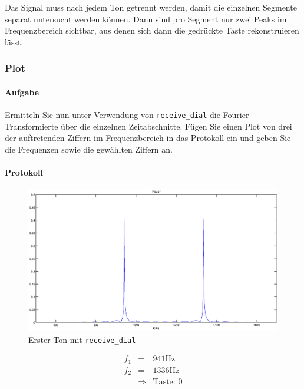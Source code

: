 \documentclass[10pt]{scrreprt}
\begin{document}
        Das Signal muss nach jedem Ton getrennt werden, damit die einzelnen Segmente
        separat untersucht werden können. Dann sind pro Segment nur zwei Peaks im
        Frequenzbereich sichtbar, aus denen sich dann die gedrückte Taste rekonstruieren
        lässt.

        \subsubsection{Plot}
        \paragraph{Aufgabe}
        Ermitteln Sie nun unter Verwendung von \texttt{receive\_dial} die Fourier Transformierte
        über die einzelnen Zeitabschnitte. Fügen Sie einen Plot von drei der auftretenden
        Ziffern im Frequenzbereich in das Protokoll ein und geben Sie die Frequenzen sowie
        die gewählten Ziffern an.

        \paragraph{Protokoll}
        \begin{center}
            \begin{figure}[H]
                \includegraphics[width=\textwidth]{img43541}
                \caption{Erster Ton mit \texttt{receive\_dial}}
            \end{figure}
        \end{center}
        \begin{eqnarray*}
            f_1 &=& 941 \si{\hertz}\\
            f_2 &=& 1336 \si{\hertz}\\
            &\Rightarrow& \text{Taste: }0
        \end{eqnarray*}
\end{document}
